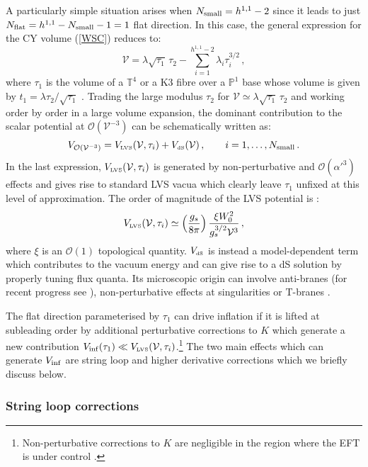 \documentclass[11pt,a4paper]{article}
\newcommand{\be}{\begin{equation}}
\newcommand{\ee}{\end{equation}}
\def\LVS{{\scriptscriptstyle \rm LVS}}
\def\dS{{\scriptscriptstyle \rm dS}}
\def\T{{\mathbb T}}
\def\P{{\mathbb P}}
\newcommand\vo{{\mathcal{V}}}
\newcommand{\mc}{\mathcal}
\begin{document}
A particularly simple situation arises when $N_{\rm small}=h^{1,1}-2$ since it leads to just $N_{\rm flat} = h^{1,1} - N_{\rm small} - 1 = 1$ flat direction. In this case, the general expression for the CY volume (\ref{WSC}) reduces to:
\be
\vo = \lambda   \sqrt{\tau_1}\,\tau_2 - \sum_{i = 1}^{h^{1,1} - 2} \lambda_i \tau_i^{3/2}\,,
\label{eq:VolumeNflat1}
\ee
where $\tau_1$ is the volume of a $\T^4$ or a K3 fibre over a $\P^1$ base whose volume is given by $t_1=\lambda\tau_2/\sqrt{\tau_1}$ \cite{Math}. Trading the large modulus $\tau_2$ for $\vo \simeq \lambda \sqrt{\tau_1}\, \tau_2$ and working order by order in a large volume expansion, the dominant contribution to the scalar potential at $\mc{O}\left(\vo^{-3}\right)$ can be schematically written as:
\be
V_{\mc{O}\left(\vo^{-3}\right)} = V_\LVS(\vo, \tau_i) + V_\dS(\vo)\,, \quad  \quad i = 1, \dots, N_{\rm small}\,.
\label{eq:PotentialOrder3}
\ee
In the last expression, $V_\LVS(\vo, \tau_i)$ is generated by non-perturbative and $\mc{O}(\alpha'^3)$ effects and gives rise to standard LVS vacua which clearly leave $\tau_1$ unfixed at this level of approximation. The order of magnitude of the LVS potential is \cite{Cicoli:2008va}:
\be
V_\LVS (\vo,\tau_i) \simeq \left(\frac{g_s}{8 \pi}\right) \frac{\xi W_0^2}{g_s^{3/2} \vo^3} \,,
\label{eq:VLVS}
\ee 
where $\xi$ is an $\mc{O}(1)$ topological quantity. $V_\dS$ is instead a model-dependent term which contributes to the vacuum energy and can give rise to a dS solution by properly tuning flux quanta. Its microscopic origin can involve anti-branes \cite{Kachru:2003aw} (for recent progress see \cite{antiDdS}), non-perturbative effects at singularities \cite{Cicoli:2012fh} or T-branes \cite{Cicoli:2015ylx}. 

The flat direction parameterised by $\tau_1$ can drive inflation if it is lifted at subleading order by additional perturbative corrections to $K$ which generate a new contribution $V_{\rm inf}(\tau_1) \ll V_\LVS (\vo,\tau_i)$.\footnote{Non-perturbative corrections to $K$ are negligible in the region where the EFT is under control \cite{Cicoli:2008va}.} The two main effects which can generate $V_{\rm inf}$ are string loop and higher derivative corrections which we briefly discuss below.

\subsubsection{String loop corrections}
\end{document}
